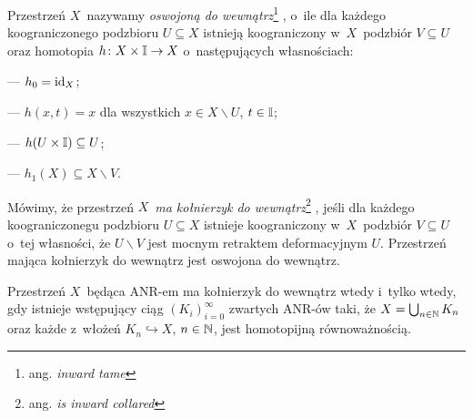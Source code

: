 Przestrzeń $X$~nazywamy \textit{oswojoną do wewnątrz}\footnote{ang. \textit{inward tame}}\label{def-osw_do_wew} \cite{Chapman76,Hughes96}, o~ile dla każdego koograniczonego podzbioru $U\subseteq X$ istnieją koograniczony w~$X$~podzbiór $V\subseteq U$ oraz homotopia $h\colon X\times \mathbb{I}\to X$ o~następujących własnościach:
\begin{compactitem}
\item[---] $h_0=\operatorname{id}_X$;
\item[---] $h(x,t)=x$ dla wszystkich $x\in X\smallsetminus U$, $t\in \mathbb{I}$;
\item[---] $h(U\times \mathbb{I})\subseteq U$;
\item[---] $h_1(X)\subseteq X\smallsetminus V$. 
\end{compactitem}

Mówimy, że przestrzeń $X$~\textit{ma kołnierzyk do wewnątrz}\footnote{ang. \textit{is inward collared}} \cite{Hughes96}, jeśli dla każdego koograniczonegu podzbioru $U\subseteq X$ istnieje koograniczony w~$X$~podzbiór $V\subseteq U$ o~tej własności, że $U\smallsetminus V$ jest mocnym retraktem deformacyjnym $U$. Przestrzeń mająca kołnierzyk do wewnątrz jest oswojona do wewnątrz.

\begin{tw}\label{tw-charakteryzacja_kolnierzyka_do_wewnatrz}
Przestrzeń $X$~będąca ANR-em ma kołnierzyk do wewnątrz wtedy i~tylko wtedy, gdy istnieje wstępujący ciąg $(K_i)_{i=0}^{\infty}$ zwartych ANR-ów taki, że $X=\bigcup_{n\in\mathbb{N}} K_n$ oraz każde z~włożeń $K_n\hookrightarrow X$, $n\in\mathbb{N}$, jest homotopijną równoważnością.
\end{tw}

